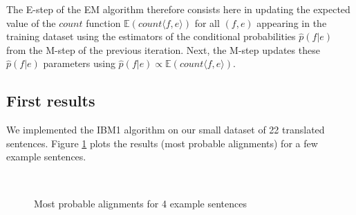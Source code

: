 \documentclass[10pt]{article}
\begin{document}
The E-step of the EM algorithm therefore consists here in updating the expected value of the $count$ function $\mathbb{E}(count \langle f,e \rangle)$ for all $(f,e)$ appearing in the training dataset using the estimators of the conditional probabilities $\hat{p}(f \vert e)$ from the M-step of the previous iteration. Next, the M-step updates these $\hat{p}(f \vert e)$ parameters using $\hat{p}(f \vert e) \propto \mathbb{E}(count \langle f,e \rangle)$.

\subsection{First results}
We implemented the IBM1 algorithm on our small dataset of 22 translated sentences. Figure \ref{examples} plots the results (most probable alignments) for a few example sentences.
\begin{figure}[h!]
\centering
{}
 \\
\caption{Most probable alignments for 4 example sentences}
\label{examples}
\end{figure}
\end{document}
